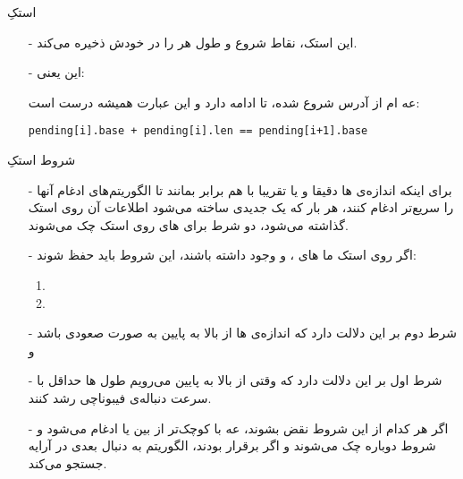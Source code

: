 \begin{frame}{استکِ }
\begin{itemize}\itemr
\item[-]
این استک، نقاط شروع و طول هر  را در خودش ذخیره می‌کند.

\item[-]
این یعنی:

 عه
ام
از آدرس
شروع شده،
تا ادامه دارد و این عبارت همیشه درست است:
\begin{latin}
\begin{flushleft}
\texttt{pending[i].base + pending[i].len == pending[i+1].base}
\end{flushleft}
\end{latin}
\end{itemize}
\end{frame}

\begin{frame}{شروط استکِ }
\begin{itemize}\itemr
\item[-]
برای اینکه اندازه‌ی ها دقیقا و یا تقریبا با هم برابر بمانند تا الگوریتم‌های ادغام آنها را سریع‌تر ادغام کنند، هر بار که یک  جدیدی ساخته می‌شود اطلاعات آن روی استک گذاشته می‌شود، دو شرط برای های روی استک چک می‌شوند.

\item[-]
اگر روی استک ما 
های
،
 و
وجود داشته باشند، این شروط باید حفظ شوند:
\begin{enumerate}\itemr
\item 
{}
\item 
{}
\end{enumerate}
\vspace{-18pt}
\item[-]
شرط دوم بر این دلالت دارد که اندازه‌ی 
ها
از بالا به پایین به صورت صعودی باشد و

\item[-]
شرط اول بر این دلالت دارد که وقتی از بالا به پایین می‌رویم طول ها حداقل با سرعت دنباله‌ی فیبوناچی رشد کنند.
\item[-]
اگر هر کدام از این شروط نقض بشوند، 
 عه
با  کوچک‌تر از بین 
یا 
ادغام می‌شود و شروط دوباره چک می‌شوند و اگر برقرار بودند، الگوریتم به دنبال 
بعدی در آرایه جستجو می‌کند.
\end{itemize}
\end{frame}


